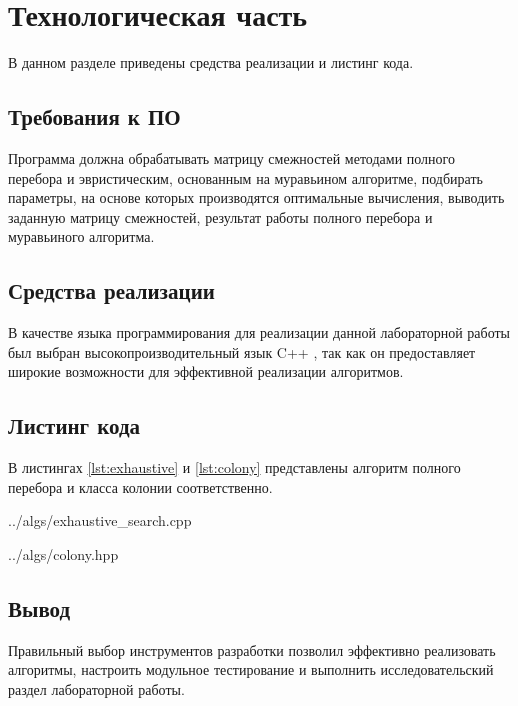 \chapter{Технологическая часть}

В данном разделе приведены средства реализации и листинг кода.

\section{Требования к ПО}

Программа должна обрабатывать матрицу смежностей методами полного перебора и эвристическим, основанным на муравьином алгоритме, подбирать параметры, на основе которых производятся оптимальные вычисления, выводить заданную матрицу смежностей, результат работы полного перебора и муравьиного алгоритма.

\section{Средства реализации}

В качестве языка программирования для реализации данной лабораторной работы был выбран высокопроизводительный язык C++ \cite{cpp17}, так как он предоставляет широкие возможности для эффективной реализации алгоритмов.

\section{Листинг кода}

В листингах \ref{lst:exhaustive} и \ref{lst:colony} представлены алгоритм полного перебора и класса колонии соответственно.

\begin{lstinputlisting}[
	caption={Алгоритм полного перебора},
	label={lst:exhaustive},
	style={cpp},
	linerange={16-45}
]{../algs/exhaustive_search.cpp}
\end{lstinputlisting}

\begin{lstinputlisting}[
	caption={Класс муравьиной колонии},
	label={lst:colony},
	style={cpp},
	linerange={7-41}
]{../algs/colony.hpp}
\end{lstinputlisting}

\section*{Вывод}

Правильный выбор инструментов разработки позволил эффективно реализовать алгоритмы, настроить модульное тестирование и выполнить исследовательский раздел лабораторной работы.
